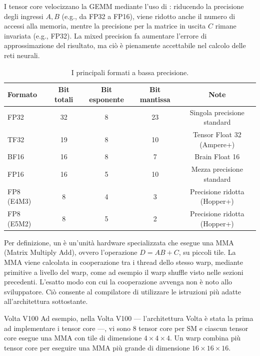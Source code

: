I tensor core velocizzano la GEMM mediante l'uso di : riducendo la precisione degli ingressi \(A,B\) (e.g., da FP32 a FP16), viene ridotto anche il numero di accessi alla memoria, mentre la precisione per la matrice in uscita \(C\) rimane invariata (e.g., FP32).
La mixed precision fa aumentare l'errore di approssimazione del risultato, ma ciò è pienamente accettabile nel calcolo delle reti neurali. 

\begin{center}
    \begin{table}
    \caption{I principali formati a bassa precisione.}
    \begin{tabular}{lcccc}
    \hline
    \textbf{Formato} & \textbf{Bit totali} & \textbf{Bit esponente} & \textbf{Bit mantissa} & \textbf{Note} \\
    \hline
    FP32 & 32 & 8 & 23 & Singola precisione standard \\
    TF32 & 19 & 8 & 10 & Tensor Float 32 (Ampere+) \\
    BF16 & 16 & 8 & 7 & Brain Float 16 \\
    FP16 & 16 & 5 & 10 & Mezza precisione standard \\
    FP8 (E4M3) & 8 & 4 & 3 & Precisione ridotta (Hopper+) \\
    FP8 (E5M2) & 8 & 5 & 2 & Precisione ridotta (Hopper+) \\
    \hline
    \end{tabular}
    \end{table}
\end{center}

Per definizione, un  è un'unità hardware specializzata che esegue una MMA (Matrix Multiply Add), ovvero l'operazione \(D = AB + C\), su piccoli tile.
La MMA viene calcolata in cooperazione tra i thread dello stesso warp, mediante primitive a livello del warp, come ad esempio il warp shuffle visto nelle sezioni precedenti.
L'esatto modo con cui la cooperazione avvenga non è noto allo sviluppatore.
Ciò consente al compilatore di utilizzare le istruzioni più adatte all'architettura sottostante.

\begin{example}{Volta V100}
    Ad esempio, nella Volta V100 --- l'architettura Volta è stata la prima ad implementare i tensor core ---, vi sono 8 tensor core per SM e ciascun tensor core esegue una MMA con tile di dimensione \(4\times 4\times 4\). 
    Un warp combina più tensor core per eseguire una MMA più grande di dimensione \(16\times 16\times 16\).
\end{example}

